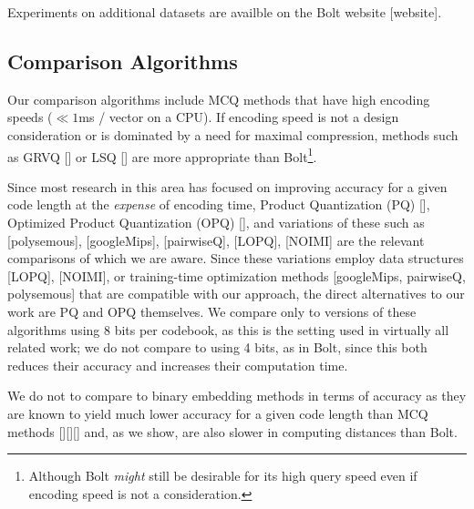 Experiments on additional datasets are availble on the Bolt website [website].

\subsection{Comparison Algorithms}

Our comparison algorithms include MCQ methods that have high encoding speeds ($\ll 1$ms / vector on a CPU). If encoding speed is not a design consideration or is dominated by a need for maximal compression, methods such as GRVQ [] or LSQ [] are more appropriate than Bolt\footnote{Although Bolt \textit{might} still be desirable for its high query speed even if encoding speed is not a consideration.}.

Since most research in this area has focused on improving accuracy for a given code length at the \textit{expense} of encoding time, Product Quantization (PQ) [], Optimized Product Quantization (OPQ) [], and variations of these such as [polysemous], [googleMips], [pairwiseQ], [LOPQ], [NOIMI] are the relevant comparisons of which we are aware. Since these variations employ data structures [LOPQ], [NOIMI], or training-time optimization methods [googleMips, pairwiseQ, polysemous] that are compatible with our approach, the direct alternatives to our work are PQ and OPQ themselves. We compare only to versions of these algorithms using 8 bits per codebook, as this is the setting used in virtually all related work; we do not compare to using 4 bits, as in Bolt, since this both reduces their accuracy and increases their computation time.


We do not to compare to binary embedding methods in terms of accuracy as they are known to yield much lower accuracy for a given code length than MCQ methods [][][] and, as we show, are also slower in computing distances than Bolt. %

